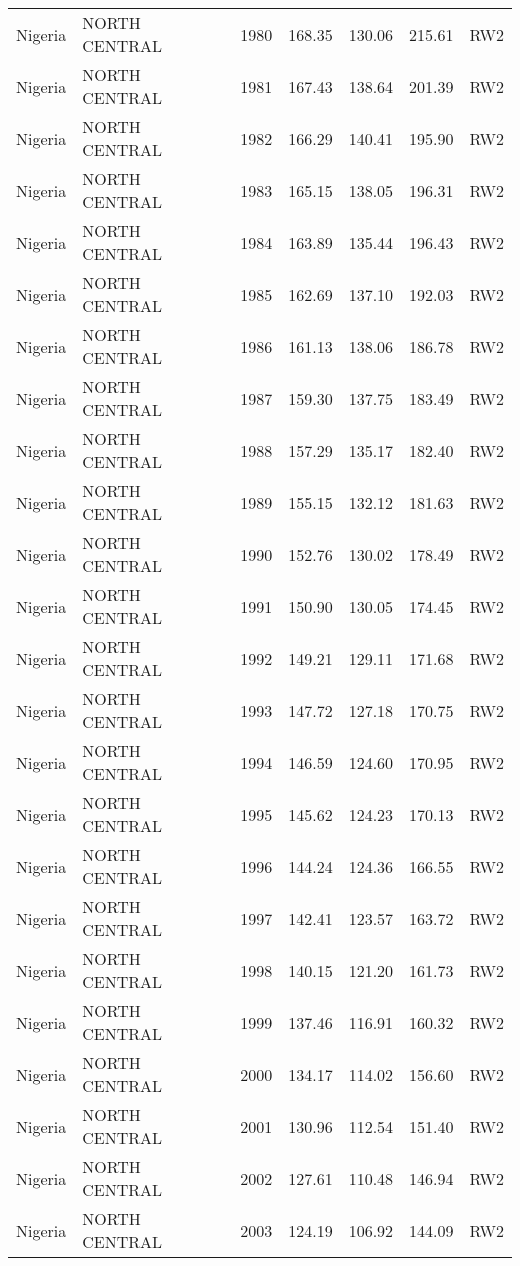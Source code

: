\begin{longtable}{lllrrrl}
  Nigeria & NORTH CENTRAL & 1980 & 168.35 & 130.06 & 215.61 & RW2 \\ 
  Nigeria & NORTH CENTRAL & 1981 & 167.43 & 138.64 & 201.39 & RW2 \\ 
  Nigeria & NORTH CENTRAL & 1982 & 166.29 & 140.41 & 195.90 & RW2 \\ 
  Nigeria & NORTH CENTRAL & 1983 & 165.15 & 138.05 & 196.31 & RW2 \\ 
  Nigeria & NORTH CENTRAL & 1984 & 163.89 & 135.44 & 196.43 & RW2 \\ 
  Nigeria & NORTH CENTRAL & 1985 & 162.69 & 137.10 & 192.03 & RW2 \\ 
  Nigeria & NORTH CENTRAL & 1986 & 161.13 & 138.06 & 186.78 & RW2 \\ 
  Nigeria & NORTH CENTRAL & 1987 & 159.30 & 137.75 & 183.49 & RW2 \\ 
  Nigeria & NORTH CENTRAL & 1988 & 157.29 & 135.17 & 182.40 & RW2 \\ 
  Nigeria & NORTH CENTRAL & 1989 & 155.15 & 132.12 & 181.63 & RW2 \\ 
  Nigeria & NORTH CENTRAL & 1990 & 152.76 & 130.02 & 178.49 & RW2 \\ 
  Nigeria & NORTH CENTRAL & 1991 & 150.90 & 130.05 & 174.45 & RW2 \\ 
  Nigeria & NORTH CENTRAL & 1992 & 149.21 & 129.11 & 171.68 & RW2 \\ 
  Nigeria & NORTH CENTRAL & 1993 & 147.72 & 127.18 & 170.75 & RW2 \\ 
  Nigeria & NORTH CENTRAL & 1994 & 146.59 & 124.60 & 170.95 & RW2 \\ 
  Nigeria & NORTH CENTRAL & 1995 & 145.62 & 124.23 & 170.13 & RW2 \\ 
  Nigeria & NORTH CENTRAL & 1996 & 144.24 & 124.36 & 166.55 & RW2 \\ 
  Nigeria & NORTH CENTRAL & 1997 & 142.41 & 123.57 & 163.72 & RW2 \\ 
  Nigeria & NORTH CENTRAL & 1998 & 140.15 & 121.20 & 161.73 & RW2 \\ 
  Nigeria & NORTH CENTRAL & 1999 & 137.46 & 116.91 & 160.32 & RW2 \\ 
  Nigeria & NORTH CENTRAL & 2000 & 134.17 & 114.02 & 156.60 & RW2 \\ 
  Nigeria & NORTH CENTRAL & 2001 & 130.96 & 112.54 & 151.40 & RW2 \\ 
  Nigeria & NORTH CENTRAL & 2002 & 127.61 & 110.48 & 146.94 & RW2 \\ 
  Nigeria & NORTH CENTRAL & 2003 & 124.19 & 106.92 & 144.09 & RW2 \\ 

\end{longtable}
